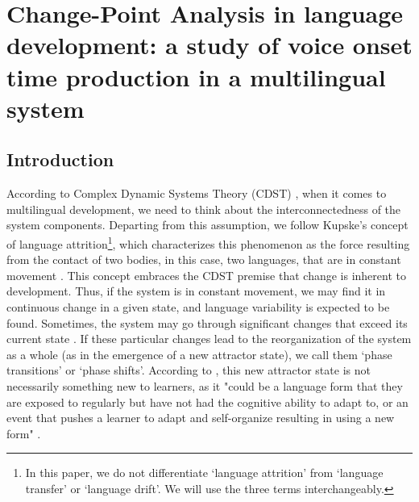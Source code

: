 \chapter{Change-Point Analysis in language development: a study of voice onset time production in a multilingual system}\label{ch:adrielledecar3}
\begin{affils}
\end{affils}

\section{Introduction}


According to Complex Dynamic Systems Theory (CDST) \citep{larsen-freeman2008,cameron2008,lowie2015,lowie2019},
when it comes to
multilingual development, we need to think about the interconnectedness of the
system components. Departing from this assumption, we follow Kupske's concept
of language attrition\footnote{In this paper, we do not differentiate ‘language
attrition’ from ‘language transfer’ or ‘language drift’. We will use the three
terms interchangeably.}, which characterizes this phenomenon as the force
resulting from the contact of two bodies, in this case, two languages, that are
in constant movement \citep[p.~39--40]{kupske2016}. This concept embraces the
CDST premise that change is inherent to development. Thus, if the system is in
constant movement, we may find it in continuous change in a given state, and
language variability is expected to be found. Sometimes, the system may go
through significant changes that exceed its current state \citep{van_dijk2007}.
If these particular changes lead to the reorganization of the
system as a whole (as in the emergence of a new attractor state), we call them
‘phase transitions’ or ‘phase shifts’. According to \citet{hepford2020}, this new
attractor state is not necessarily something new to learners, as it "could be a
language form that they are exposed to regularly but have not had the cognitive
ability to adapt to, or an event that pushes a learner to adapt and
self-organize resulting in using a new form" \citep[p.~162--163]{hepford2020}.

